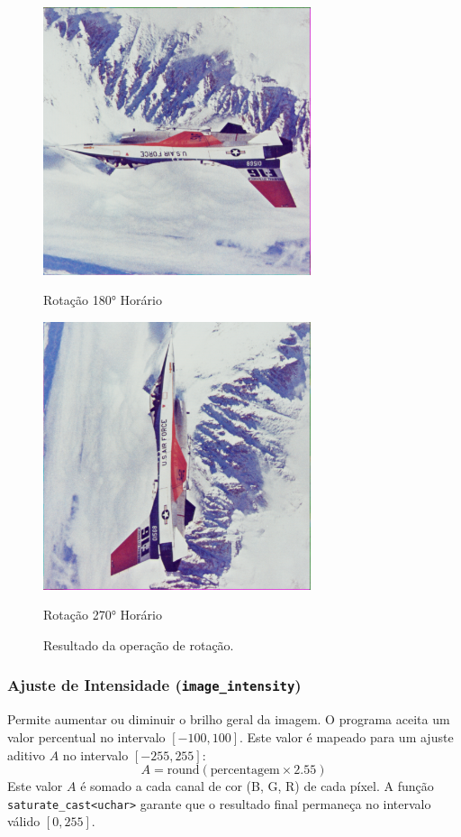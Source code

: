 \documentclass[a4paper, 11pt, portuguese]{article}
\begin{document}
\begin{figure}[htbp]
\begin{minipage}{0.48\textwidth}
    \includegraphics[width=0.7\textwidth]{imagens/airplane_rotated180.png}
    \caption*{Rotação 180° Horário}
\end{minipage}
\hfill
\begin{minipage}{0.48\textwidth}
    \centering
    \includegraphics[width=0.7\textwidth]{imagens/airplane_rotated270.png}
    \caption*{Rotação 270° Horário}
\end{minipage}
\caption{Resultado da operação de rotação.}
\label{fig:rotacao}
\end{figure}

\subsubsection{Ajuste de Intensidade (\texttt{image\_intensity})}
Permite aumentar ou diminuir o brilho geral da imagem. O programa aceita um valor percentual no intervalo $[-100, 100]$. Este valor é mapeado para um ajuste aditivo $A$ no intervalo $[-255, 255]$:
$$ A = \text{round}(\text{percentagem} \times 2.55) $$
Este valor $A$ é somado a cada canal de cor (B, G, R) de cada píxel. A função \texttt{saturate\_cast<uchar>} garante que o resultado final permaneça no intervalo válido $[0, 255]$.
\end{document}
